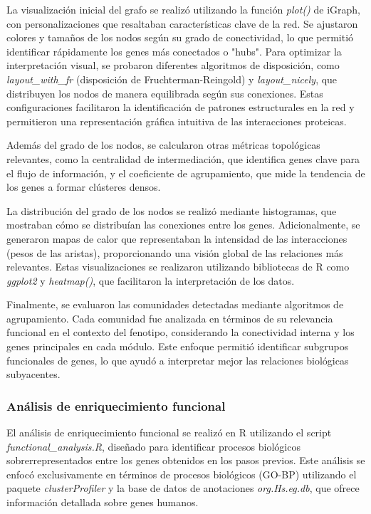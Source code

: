 La visualización inicial del grafo se realizó utilizando la función \textit{plot()} de iGraph, con personalizaciones que resaltaban características clave de la red. Se ajustaron colores y tamaños de los nodos según su grado de conectividad, lo que permitió identificar rápidamente los genes más conectados o "hubs". Para optimizar la interpretación visual, se probaron diferentes algoritmos de disposición, como \textit{layout\_with\_fr} (disposición de Fruchterman-Reingold) y \textit{layout\_nicely}, que distribuyen los nodos de manera equilibrada según sus conexiones. Estas configuraciones facilitaron la identificación de patrones estructurales en la red y permitieron una representación gráfica intuitiva de las interacciones proteicas.

Además del grado de los nodos, se calcularon otras métricas topológicas relevantes, como la centralidad de intermediación, que identifica genes clave para el flujo de información, y el coeficiente de agrupamiento, que mide la tendencia de los genes a formar clústeres densos.

La distribución del grado de los nodos se realizó mediante histogramas, que mostraban cómo se distribuían las conexiones entre los genes. Adicionalmente, se generaron mapas de calor que representaban la intensidad de las interacciones (pesos de las aristas), proporcionando una visión global de las relaciones más relevantes. Estas visualizaciones se realizaron utilizando bibliotecas de R como \textit{ggplot2} y \textit{heatmap()}, que facilitaron la interpretación de los datos.

Finalmente, se evaluaron las comunidades detectadas mediante algoritmos de agrupamiento. Cada comunidad fue analizada en términos de su relevancia funcional en el contexto del fenotipo, considerando la conectividad interna y los genes principales en cada módulo. Este enfoque permitió identificar subgrupos funcionales de genes, lo que ayudó a interpretar mejor las relaciones biológicas subyacentes.

\subsubsection{\textbf{Análisis de enriquecimiento funcional}}

El análisis de enriquecimiento funcional se realizó en R utilizando el script \textit{functional\_analysis.R}, diseñado para identificar procesos biológicos sobrerrepresentados entre los genes obtenidos en los pasos previos. Este análisis se enfocó exclusivamente en términos de procesos biológicos (GO-BP) utilizando el paquete \textit{clusterProfiler} y la base de datos de anotaciones \textit{org.Hs.eg.db}, que ofrece información detallada sobre genes humanos.

